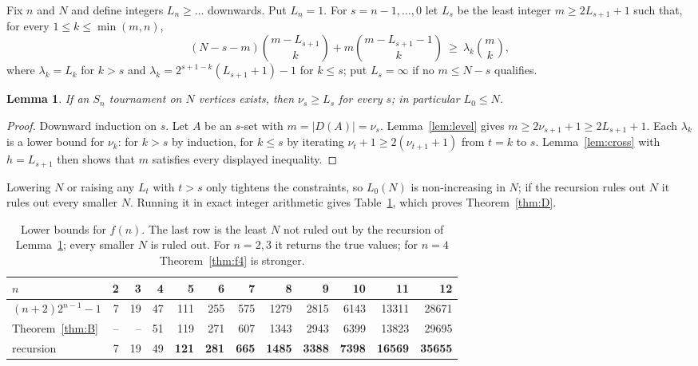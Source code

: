 \documentclass[11pt]{amsart}
\newtheorem{lemma}[theorem]{Lemma}
\theoremstyle{definition}
\theoremstyle{remark}
\newcommand{\D}{D}
\newcommand{\abs}[1]{\lvert #1\rvert}
\begin{document}
Fix $n$ and $N$ and define integers $L_n\ge\dots$ downwards. Put $L_n=1$. For $s=n-1,\dots,0$ let $L_s$ be the least integer
$m\ge2L_{s+1}+1$ such that, for every $1\le k\le\min(m,n)$,
\[
  (N-s-m)\binom{m-L_{s+1}}{k}+m\binom{m-L_{s+1}-1}{k}\ \ge\ \lambda_k\binom mk,
\]
where $\lambda_k=L_k$ for $k>s$ and $\lambda_k=2^{s+1-k}(L_{s+1}+1)-1$ for $k\le s$; put $L_s=\infty$ if no $m\le N-s$ qualifies.

\begin{lemma}\label{lem:rec}
If an $S_n$ tournament on $N$ vertices exists, then $\nu_s\ge L_s$ for every $s$; in particular $L_0\le N$.
\end{lemma}

\begin{proof}
Downward induction on $s$. Let $A$ be an $s$-set with $m=\abs{\D(A)}=\nu_s$. Lemma~\ref{lem:level} gives
$m\ge2\nu_{s+1}+1\ge2L_{s+1}+1$. Each $\lambda_k$ is a lower bound for $\nu_k$: for $k>s$ by induction, for $k\le s$ by iterating
$\nu_t+1\ge2(\nu_{t+1}+1)$ from $t=k$ to $s$. Lemma~\ref{lem:cross} with $h=L_{s+1}$ then shows that $m$ satisfies every displayed
inequality.
\end{proof}

Lowering $N$ or raising any $L_t$ with $t>s$ only tightens the constraints, so $L_0(N)$ is non-increasing in $N$; if the recursion
rules out $N$ it rules out every smaller $N$. Running it in exact integer arithmetic gives Table~\ref{tab:D}, which proves
Theorem~\ref{thm:D}.

\begin{table}[ht]
\centering
\begin{tabular}{lrrrrrrrrrrr}
\toprule
$n$ & 2 & 3 & 4 & 5 & 6 & 7 & 8 & 9 & 10 & 11 & 12\\
\midrule
$(n+2)2^{n-1}-1$ & 7 & 19 & 47 & 111 & 255 & 575 & 1279 & 2815 & 6143 & 13311 & 28671\\
Theorem~\ref{thm:B} & -- & -- & 51 & 119 & 271 & 607 & 1343 & 2943 & 6399 & 13823 & 29695\\
recursion & 7 & 19 & 49 & \textbf{121} & \textbf{281} & \textbf{665} & \textbf{1485} & \textbf{3388} & \textbf{7398} & \textbf{16569} & \textbf{35655}\\
\bottomrule
\end{tabular}
\medskip
\caption{Lower bounds for $f(n)$. The last row is the least $N$ not ruled out by the recursion of Lemma~\ref{lem:rec}; every
smaller $N$ is ruled out. For $n=2,3$ it returns the true values; for $n=4$ Theorem~\ref{thm:f4} is stronger.}
\label{tab:D}
\end{table}
\end{document}

